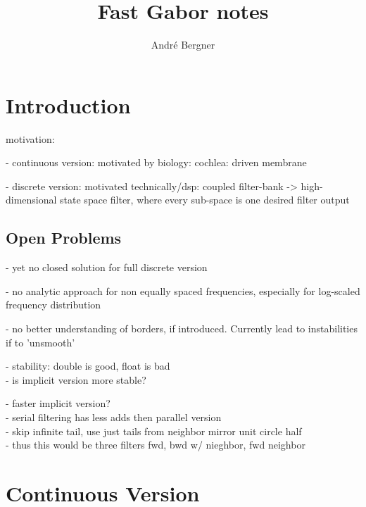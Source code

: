 \documentclass[11pt,twocolumn]{article}
\begin{document}
\title{Fast Gabor notes}
\author{Andr\'e Bergner}
\maketitle

    \section{Introduction}

motivation:

- continuous version: motivated by biology: cochlea: driven membrane

- discrete version: motivated technically/dsp: coupled filter-bank -> high-dimensional state space filter, where every sub-space is one desired filter output

  \subsection{Open Problems}

- yet no closed solution for full discrete version

- no analytic approach for non equally spaced frequencies, especially for log-scaled frequency distribution

- no better understanding of borders, if introduced. Currently lead to instabilities if to 'unsmooth'

  - stability: double is good, float is bad\\
- is implicit version more stable?

  - faster implicit version?\\
- serial filtering has less adds then parallel version\\
- skip infinite tail, use just tails from neighbor mirror unit circle half\\
- thus this would be three filters fwd, bwd w/ nieghbor, fwd neighbor




\section{Continuous Version}



\end{document}
